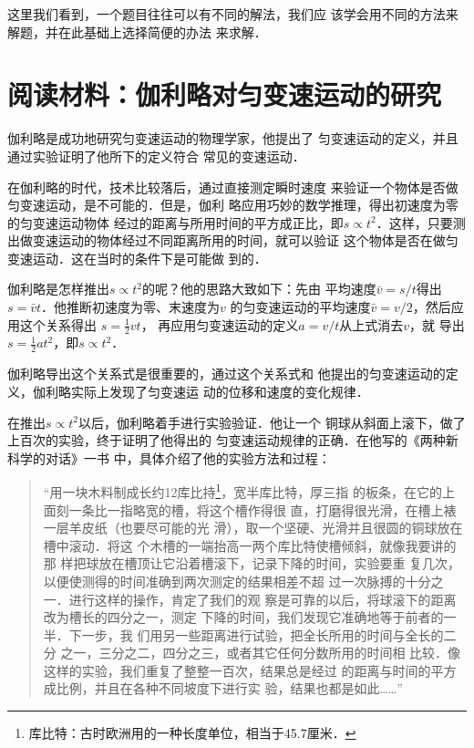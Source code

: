     这里我们看到，一个题目往往可以有不同的解法，我们应
该学会用不同的方法来解题，并在此基础上选择简便的办法
来求解．


\section*{阅读材料：伽利略对匀变速运动的研究}
   伽利略是成功地研究匀变速运动的物理学家，他提出了
匀变速运动的定义，并且通过实验证明了他所下的定义符合
常见的变速运动．

    在伽利略的时代，技术比较落后，通过直接测定瞬时速度
来验证一个物体是否做匀变速运动，是不可能的．但是，伽利
略应用巧妙的数学推理，得出初速度为零的匀变速运动物体
经过的距离与所用时间的平方成正比，即$s\propto t^2$．这样，只要测
出做变速运动的物体经过不同距离所用的时间，就可以验证
这个物体是否在做匀变速运动．这在当时的条件下是可能做
到的．

    伽利略是怎样推出$s\propto t^2$的呢？他的思路大致如下：先由
平均速度$\bar v=s/t$得出$s=\bar v t$．他推断初速度为零、末速度为$v$
的匀变速运动的平均速度$\bar v=v/2$，然后应用这个关系得出
$s=\frac{1}{2} v t$，
再应用匀变速运动的定义$a=v/t$从上式消去$v$，就
导出$s=\frac{1}{2} a t^2$，即$s\propto t^2$．

  伽利略导出这个关系式是很重要的，通过这个关系式和
他提出的匀变速运动的定义，伽利略实际上发现了匀变速运
动的位移和速度的变化规律．

    在推出$s\propto t^2$以后，伽利略着手进行实验验证．他让一个
铜球从斜面上滚下，做了上百次的实验，终于证明了他得出的
匀变速运动规律的正确．在他写的《两种新科学的对话》一书
中，具体介绍了他的实验方法和过程：

\begin{quotation}
    “用一块木料制成长约12库比持\footnote{库比特：古时欧洲用的一种长度单位，相当于45.7厘米．
}，宽半库比特，厚三指
的板条，在它的上面刻一条比一指略宽的槽，将这个槽作得很
直，打磨得很光滑，在槽上裱一层羊皮纸（也要尽可能的光
滑），取一个坚硬、光滑并且很圆的铜球放在槽中滚动．将这
个木槽的一端抬高一两个库比特使槽倾斜，就像我要讲的那
样把球放在槽顶让它沿着槽滚下，记录下降的时间，实验要重
复几次，以便使测得的时间准确到两次测定的结果相差不超
过一次脉搏的十分之一．进行这样的操作，肯定了我们的观
察是可靠的以后，将球滚下的距离改为槽长的四分之一，测定
下降的时间，我们发现它准确地等于前者的一半．下一步，我
们用另一些距离进行试验，把全长所用的时间与全长的二分
之一，三分之二，四分之三，或者其它任何分数所用的时间相
比较．像这样的实验，我们重复了整整一百次，结果总是经过
的距离与时间的平方成比例，并且在各种不同坡度下进行实
验，结果也都是如此……”
\end{quotation}

